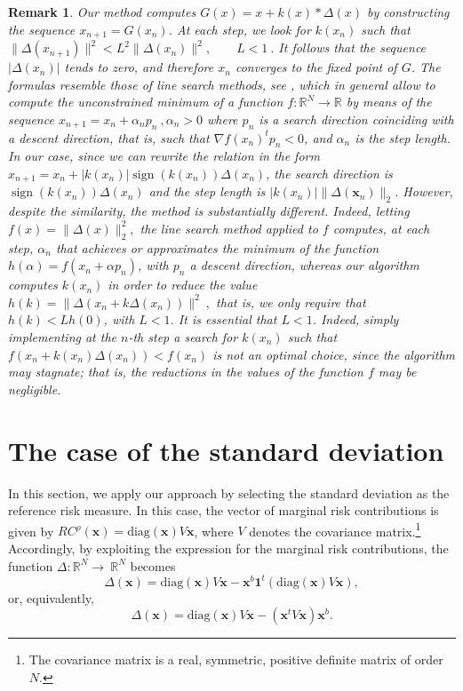 \documentclass[preprint,11pt,authoryear]{elsarticle}
\newtheorem{remark}{Remark}%
\begin{document}
\begin{remark}
Our method computes $G(x)=x+k(x)*\Delta(x)$ by constructing the sequence $x_{n+1}=G(x_n)$. At each step, we look for $k(x_n)$ such that
$\|\Delta(x_{n+1})\|^2 < L^2\|\Delta(x_n)\|^2, \qquad L <1 \ .$ It follows that the sequence $|\Delta(x_n)|$ tends to zero, and therefore $x_n$ converges to the fixed point of $G$. The formulas resemble those of line search methods, see \cite{sun2006optimization}, which in general allow to compute the unconstrained minimum of a function $f:\mathbb R^N \rightarrow \mathbb R$ by means of the sequence $x_{n+1}=x_n+\alpha_n p_n \ , \alpha_n>0 $ where $p_n$ is a search direction coinciding with a descent direction, that is, such that $\nabla f(x_n)^tp_n<0$, and $\alpha_n$ is the step length. In our case, since we can rewrite the relation in the form $x_{n+1}=x_n + |k(x_n)| \operatorname{sign}(k(x_n)) \Delta(x_n) $, the search direction is $\operatorname{sign}(k(x_n)) \Delta(x_n)$ and the step length is $|k(x_n)| \| \Delta(\mathbf{x}_n) \|_2$. However, despite the similarity, the method is substantially different. Indeed, letting $f(x)=\|\Delta(x)\|^2_2, $ the line search method applied to $f$ computes, at each step, $\alpha_n$ that achieves or approximates the minimum of the function $h(\alpha)= f(x_n+\alpha p_n)$, with $p_n$ a descent direction, whereas our algorithm computes $k(x_n)$ in order to reduce the value $h(k)= \|\Delta(x_n+k\Delta(x_n))\|^2\ ,$ that is, we only require that $h(k) < L h(0)$, with $L<1$. It is essential that $L<1$. Indeed, simply implementing at the $n$-th step a search for $k(x_n)$ such that $f(x_n+k(x_n)\Delta(x_n)) < f(x_n)$ is not an optimal choice, since the algorithm may stagnate; that is, the reductions in the values of the function $f$ may be negligible.
\end{remark}

\section{The case of the standard deviation}\label{stdev}

In this section, we apply our approach by selecting the standard deviation as the reference risk measure. In this case, the vector of marginal risk contributions is given by $\textit{RC}^{\rho}(\mathbf{x}) = \textrm{diag} (\mathbf{x}) V \mathbf{x}$, where $V$ denotes the covariance matrix.\footnote{The covariance matrix is a real, symmetric, positive definite matrix of order $N$.}
Accordingly, by exploiting the expression for the marginal risk contributions, the function $\Delta: \mathbb R^N \rightarrow \ \mathbb R^N$ becomes
$$ \Delta(\mathbf{x})=  \textrm{diag}(\mathbf{x}) V \mathbf{x} - \mathbf{x}^b \textbf{1}^t(\textrm{diag}(\mathbf{x}) V \mathbf{x}), $$
or, equivalently, 
$$ \Delta (\mathbf{x})=  \textrm{diag}(\mathbf{x}) V \mathbf{x} - (\mathbf{x}^t V \mathbf{x}) \mathbf{x}^b. $$
\end{document}
